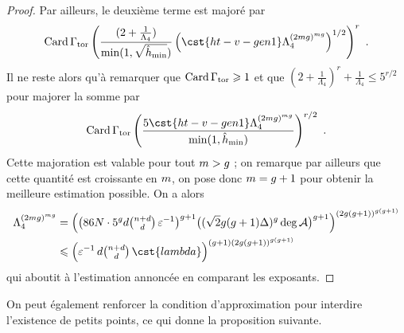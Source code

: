 \begin{proof}
  Par ailleurs, le deuxième terme est majoré par
  \begin{equation}
    \card \Gamma_\torsion
    \left(
      \frac{
        (2 + \frac1{\Lambda_4})
      }{
        \min(1, \sqrt{\hmin})
      }
      \left(
        \cst{ht-v-gen1} \Lambda_4^{(2\puiss\genre)^{\puiss\genre}}
      \right)^{1/2}
    \right)^r
    \pmm.
  \end{equation}
  Il ne reste alors qu'à remarquer que \( \operatorname{Card} \Gamma_{\mathrm{tor}} \geqslant 1 \) et
  que \( (2 + \frac1{\Lambda_4})^r + \frac1{\Lambda_4} \le 5^{r/2} \) pour
  majorer la somme par
  \begin{equation}
    \card \Gamma_\torsion
    \left(
      \frac{
        5 \cst{ht-v-gen1} \Lambda_4^{(2\puiss\genre)^{\puiss\genre}}
      }{
        \min(1, \hmin)
      }
    \right)^{r/2}
    \pmm.
  \end{equation}
  Cette majoration est valable pour tout \( m > g \) ;
  on remarque par ailleurs que cette quantité est croissante en \( m \),
  on pose donc \( m = g + 1 \) pour obtenir la meilleure estimation
  possible. On a alors
  \begin{align}
    \Lambda_4^{(2\puiss\genre)^{\puiss\genre}}
    & =
    \left(
      \bigl(
        86 \nclmaps \cdot 5^\genre d \sbin{\dimp + d}{d}
        \, \expapx^{-1}
      \bigr)^{ \genre + 1 }
      \bigl( (\sqrt2 \genre(\genre+1)\Delta)^\genre \deg \va \bigr)^{\genre+1}
    \right)^{(2\genre(\genre+1))^{\genre(\genre+1)}}
    \\ & \le
    \Bigl(
      \expapx^{-1}
      \, d \sbin{\dimp + d}{d}
      \, \cst{lambda}
    \Bigr)^{(\genre+1) (2\genre(\genre+1))^{\genre(\genre+1)}}
  \end{align}
  qui aboutit à l'estimation annoncée en comparant les exposants.
\end{proof}

On peut également renforcer la condition d'approximation pour interdire
l'existence de petits points, ce qui donne la proposition suivante.

